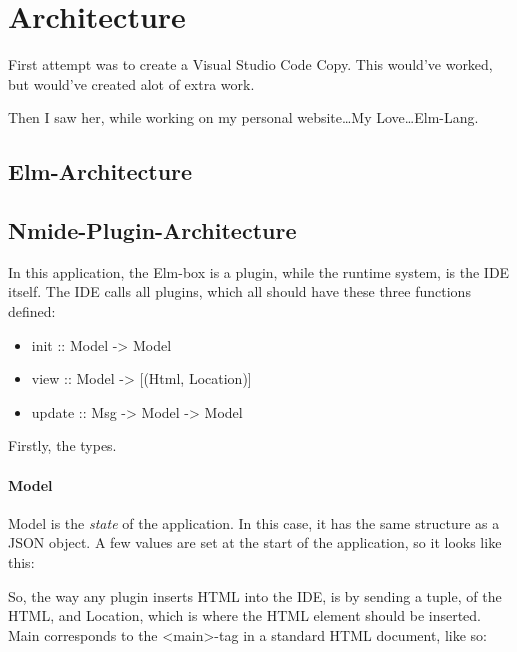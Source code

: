 \section{Architecture}


First attempt was to create a Visual Studio Code Copy. This would've worked, but would've created alot of extra work.


Then I saw her, while working on my personal website\dots My Love\dots Elm-Lang.

\subsection{Elm-Architecture}


\subsection{Nmide-Plugin-Architecture}

In this application, the Elm-box is a plugin, while the runtime system, is the IDE itself. The IDE calls all plugins,
which all should have these three functions defined:

\begin{itemize}
  \item init :: Model -> Model
  \item view :: Model -> [(Html, Location)]
  \item update :: Msg -> Model -> Model
\end{itemize}

Firstly, the types.

\paragraph{Model}
Model is the \textit{state} of the application. In this case, it has the same structure as a JSON object. A few values are
set at the start of the application, so it looks like this:


So, the way any plugin inserts HTML into the IDE, is by sending a tuple, of the HTML, and Location, which is where
the HTML element should be inserted. Main corresponds to the <main>-tag in a standard HTML document, like so:

